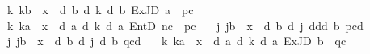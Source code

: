 \begin{isabellebody}
\ \ {\isasymor}\ {\isacharparenleft}{\kern0pt}{\isasymexists}k{\isachardot}{\kern0pt}\ k{\isasymnoteq}b\ {\isasymand}\ x\ {\isacharequal}{\kern0pt}\ {\isasymD}\isactrlsup d\ b\ {\isacharparenleft}{\kern0pt}{\isasymB}\isactrlsup d\ k\ {\isacharparenleft}{\kern0pt}{\isasymD}\isactrlsup d\ b\ {\isacharparenleft}{\kern0pt}ExJD\ a\ {\isasymoplus}\ {\isacharparenleft}{\kern0pt}p\isactrlsup c{\isacharparenright}{\kern0pt}{\isacharparenright}{\kern0pt}{\isacharparenright}{\kern0pt}{\isacharparenright}{\kern0pt}{\isacharparenright}{\kern0pt}\isanewline
\ \ {\isasymor}\ {\isacharparenleft}{\kern0pt}{\isasymexists}k{\isachardot}{\kern0pt}\ k{\isasymnoteq}a\ {\isasymand}\ x\ {\isacharequal}{\kern0pt}\ {\isasymD}\isactrlsup d\ a\ {\isacharparenleft}{\kern0pt}{\isasymB}\isactrlsup d\ k\ {\isacharparenleft}{\kern0pt}{\isasymB}\isactrlsup d\ a\ {\isacharparenleft}{\kern0pt}EntD\ {\isacharparenleft}{\kern0pt}n\isactrlsup c{\isacharparenright}{\kern0pt}\ {\isasymoplus}\ {\isacharparenleft}{\kern0pt}p\isactrlsup c{\isacharparenright}{\kern0pt}{\isacharparenright}{\kern0pt}{\isacharparenright}{\kern0pt}{\isacharparenright}{\kern0pt}{\isacharparenright}{\kern0pt}\isanewline
\ \ {\isasymor}\ {\isacharparenleft}{\kern0pt}{\isasymexists}j{\isachardot}{\kern0pt}\ j{\isasymnoteq}b\ {\isasymand}\ x\ {\isacharequal}{\kern0pt}\ {\isasymD}\isactrlsup d\ b\ {\isacharparenleft}{\kern0pt}{\isasymB}\isactrlsup d\ j\ {\isacharparenleft}{\kern0pt}{\isasymnot}\isactrlsup d{\isasymnot}\isactrlsup d{\isacharparenleft}{\kern0pt}{\isasymB}\isactrlsup d\ b\ {\isacharbraceleft}{\kern0pt}p\isactrlsup c{\isacharbraceright}{\kern0pt}\isactrlsup d{\isacharparenright}{\kern0pt}{\isacharparenright}{\kern0pt}{\isacharparenright}{\kern0pt}{\isacharparenright}{\kern0pt}\isanewline
\ \ {\isasymor}\ {\isacharparenleft}{\kern0pt}{\isasymexists}j{\isachardot}{\kern0pt}\ j{\isasymnoteq}b\ {\isasymand}\ x\ {\isacharequal}{\kern0pt}\ {\isasymD}\isactrlsup d\ b\ {\isacharparenleft}{\kern0pt}{\isasymB}\isactrlsup d\ j\ {\isacharparenleft}{\kern0pt}{\isasymB}\isactrlsup d\ b\ {\isacharbraceleft}{\kern0pt}q\isactrlsup c{\isacharbraceright}{\kern0pt}\isactrlsup d{\isacharparenright}{\kern0pt}{\isacharparenright}{\kern0pt}{\isacharparenright}{\kern0pt}\isanewline
\ \ {\isasymor}\ {\isacharparenleft}{\kern0pt}{\isasymexists}k{\isachardot}{\kern0pt}\ k{\isasymnoteq}a\ {\isasymand}\ x\ {\isacharequal}{\kern0pt}\ {\isasymD}\isactrlsup d\ a\ {\isacharparenleft}{\kern0pt}{\isasymB}\isactrlsup d\ k\ {\isacharparenleft}{\kern0pt}{\isasymD}\isactrlsup d\ a\ {\isacharparenleft}{\kern0pt}ExJD\ b\ {\isasymoplus}\ {\isacharparenleft}{\kern0pt}q\isactrlsup c{\isacharparenright}{\kern0pt}{\isacharparenright}{\kern0pt}{\isacharparenright}{\kern0pt}{\isacharparenright}{\kern0pt}{\isacharparenright}{\kern0pt}\isanewline

\end{isabellebody}
